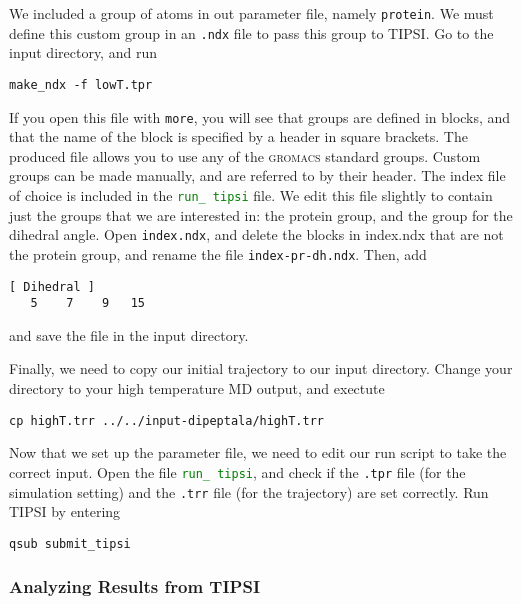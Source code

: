 \documentclass[]{article}
\begin{document}
We included a group of atoms in out parameter file, namely \texttt{protein}. We must define this custom group in an \texttt{.ndx} file to pass this group to TIPSI. Go to the input directory, and run
%
\begin{lstlisting}
make_ndx -f lowT.tpr
\end{lstlisting}
%
If you open this file with \texttt{more}, you will see that groups are defined in blocks, and that the name of the block is specified by a header in square brackets. The produced file allows you to use any of the \textsc{gromacs} standard groups. Custom groups can be made manually, and are referred to by their header. The index file of choice is included in the \textcolor{green}{\texttt{run\_ tipsi}} file. We edit this file slightly to contain just the groups that we are interested in: the protein group, and the group for the dihedral angle. Open \texttt{index.ndx}, and delete the blocks in index.ndx that are not the protein group, and rename the file \texttt{index-pr-dh.ndx}. Then, add
%
\begin{lstlisting}
[ Dihedral ]
   5    7    9   15
\end{lstlisting}
%
and save the file in the input directory.

Finally, we need to copy our initial trajectory to our input directory. Change your directory to your high temperature MD output, and exectute 
%
\begin{lstlisting}
cp highT.trr ../../input-dipeptala/highT.trr
\end{lstlisting}
%

Now that we set up the parameter file, we need to edit our run script to take the correct input. Open the file \textcolor{green}{\texttt{run\_ tipsi}}, and check if the \texttt{.tpr} file (for the simulation setting) and the \texttt{.trr} file (for the trajectory) are set correctly. Run \textsc{TIPSI} by entering
%
\begin{lstlisting}
qsub submit_tipsi
\end{lstlisting}
%

\subsubsection*{Analyzing Results from TIPSI}



\newpage
\end{document}
